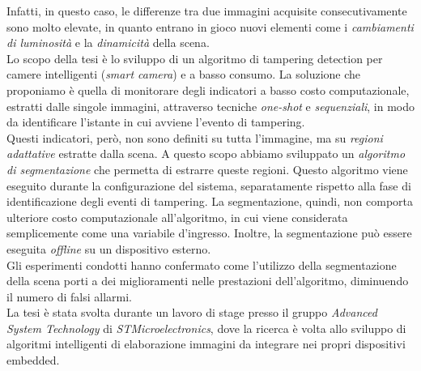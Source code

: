 Infatti, in questo caso, le differenze tra due immagini acquisite consecutivamente sono molto elevate, in quanto entrano in gioco nuovi elementi come i \textit{cambiamenti di luminosit\`a} e la \textit{dinamicit\`a} della scena.\\
Lo scopo della tesi \`e lo sviluppo di un algoritmo di tampering detection per camere intelligenti (\textit{smart camera}) e a basso consumo.
La soluzione che proponiamo \`e quella di monitorare degli indicatori a basso costo computazionale, estratti dalle singole immagini, attraverso tecniche \textit{one-shot} e \textit{sequenziali}, in modo da identificare l'istante in cui avviene l'evento di tampering.\\
Questi indicatori, per\`o, non sono definiti su tutta l'immagine, ma su \textit{regioni adattative} estratte dalla scena.
A questo scopo abbiamo sviluppato un \textit{algoritmo di segmentazione} che permetta di estrarre queste regioni.
Questo algoritmo viene eseguito durante la configurazione del sistema, separatamente rispetto alla fase di identificazione degli eventi di tampering.
La segmentazione, quindi, non comporta ulteriore costo computazionale all'algoritmo, in cui viene considerata semplicemente come una variabile d'ingresso.
Inoltre, la segmentazione pu\`o essere eseguita \textit{offline} su un dispositivo esterno.\\
Gli esperimenti condotti hanno confermato come l'utilizzo della segmentazione della scena porti a dei miglioramenti nelle prestazioni dell'algoritmo, diminuendo il numero di falsi allarmi.\\
La tesi \`e stata svolta durante un lavoro di stage presso il gruppo \textit{Advanced System Technology} di \textit{STMicroelectronics}, dove la ricerca \`e volta allo sviluppo di algoritmi intelligenti di elaborazione immagini da integrare nei propri dispositivi embedded.\\
